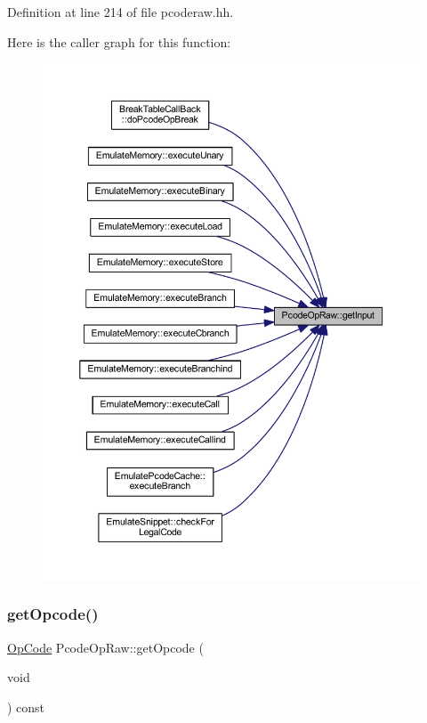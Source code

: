 Definition at line 214 of file pcoderaw.\+hh.

Here is the caller graph for this function\+:
\nopagebreak
\begin{figure}[H]
\begin{center}
\leavevmode
\includegraphics[width=350pt]{class_pcode_op_raw_a450f1af7453d285458b9cc00d5562bc4_icgraph}
\end{center}
\end{figure}
\mbox{\label{class_pcode_op_raw_a6c8a73aa191303dfb59ea23acf9edd42}} 
\subsubsection{\texorpdfstring{getOpcode()}{getOpcode()}}
{\footnotesize\ttfamily \mbox{\hyperlink{opcodes_8hh_abeb7dfb0e9e2b3114e240a405d046ea7}{Op\+Code}} Pcode\+Op\+Raw\+::get\+Opcode (\begin{DoxyParamCaption}\item[{void}]{ }\end{DoxyParamCaption}) const\hspace{0.3cm}{\ttfamily [inline]}}



